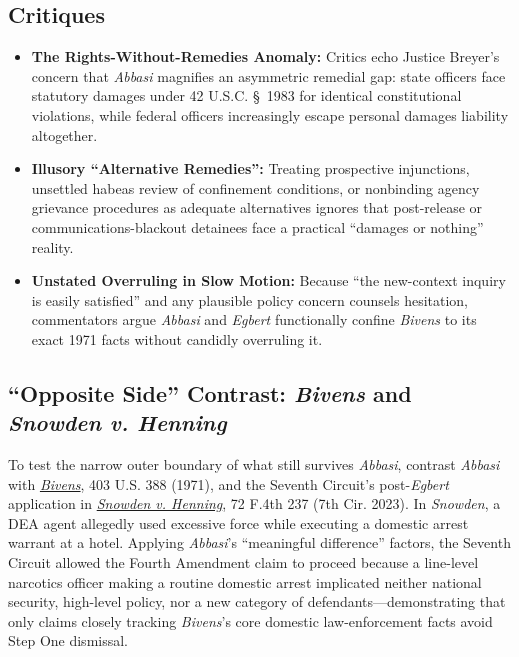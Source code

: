 \documentclass[12pt]{article}
\begin{document}
\subsection{Critiques}

\begin{itemize}
  \item \textbf{The Rights-Without-Remedies Anomaly:} Critics echo Justice Breyer's concern that \textit{Abbasi} magnifies an asymmetric remedial gap: state officers face statutory damages under 42 U.S.C. \S~1983 for identical constitutional violations, while federal officers increasingly escape personal damages liability altogether.
  \item \textbf{Illusory ``Alternative Remedies'':} Treating prospective injunctions, unsettled habeas review of confinement conditions, or nonbinding agency grievance procedures as adequate alternatives ignores that post-release or communications-blackout detainees face a practical ``damages or nothing'' reality.
  \item \textbf{Unstated Overruling in Slow Motion:} Because ``the new-context inquiry is easily satisfied'' and any plausible policy concern counsels hesitation, commentators argue \textit{Abbasi} and \textit{Egbert} functionally confine \textit{Bivens} to its exact 1971 facts without candidly overruling it.
\end{itemize}

\subsection{``Opposite Side'' Contrast: \textit{Bivens} and \textit{Snowden v. Henning}}

To test the narrow outer boundary of what still survives \textit{Abbasi}, contrast \textit{Abbasi} with \href{https://supreme.justia.com/cases/federal/us/403/388/}{\textit{Bivens}}, 403 U.S. 388 (1971), and the Seventh Circuit's post-\textit{Egbert} application in \href{https://media.ca7.uscourts.gov/cgi-bin/OpinionsWeb/processWebInputExternal.pl?Submit=Display&Path=Y2023/D06-27/C:21-1463:J:Sykes:aut:T:fnOp:N:3066917:S:0}{\textit{Snowden v. Henning}}, 72 F.4th 237 (7th Cir. 2023). In \textit{Snowden}, a DEA agent allegedly used excessive force while executing a domestic arrest warrant at a hotel. Applying \textit{Abbasi}'s ``meaningful difference'' factors, the Seventh Circuit allowed the Fourth Amendment claim to proceed because a line-level narcotics officer making a routine domestic arrest implicated neither national security, high-level policy, nor a new category of defendants---demonstrating that only claims closely tracking \textit{Bivens}'s core domestic law-enforcement facts avoid Step One dismissal.
\end{document}
